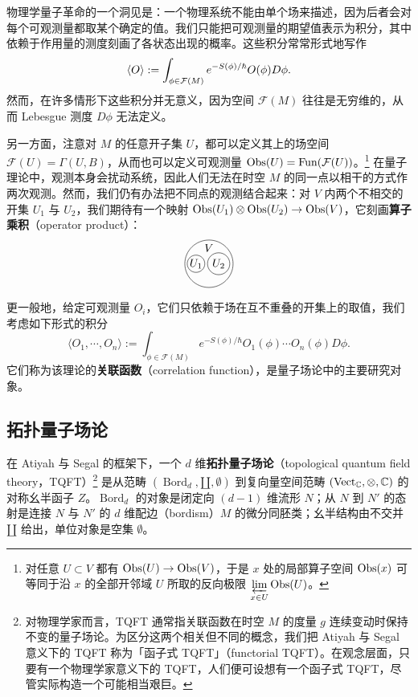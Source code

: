 物理学量子革命的一个洞见是：一个物理系统不能由单个场来描述，因为后者会对每个可观测量都取某个确定的值。我们只能把可观测量的期望值表示为积分，其中依赖于作用量的测度刻画了各状态出现的概率。这些积分常常形式地写作
\begin{equation}
    \langle O\rangle :=  \int_{\phi\in \mathcal{F}(M)} e^{ - S(\phi)/ \hbar  } O(\phi) D \phi.  \label{eq:expected-value}\notag
\end{equation} 然而，在许多情形下这些积分并无意义，因为空间 $\mathcal{F}(M)$ 往往是无穷维的，从而 Lebesgue 测度 $D\phi$ 无法定义。

另一方面，注意对 $M$ 的任意开子集 $U$，都可以定义其上的场空间 $\mathcal{F}(U)=\Gamma(U,B)$，从而也可以定义可观测量 $\operatorname{Obs}(U) = \operatorname{Fun}(\mathcal{F}(U))$。\footnote{对任意 $U\subset V$ 都有 $\operatorname{Obs}(U)\to \operatorname{Obs}(V)$，于是 $x$ 处的局部算子空间 $\operatorname{Obs}(x)$ 可等同于沿 $x$ 的全部开邻域 $U$ 所取的反向极限 $\displaystyle\varprojlim_{x \in U} \operatorname{Obs}(U)$。} 在量子理论中，观测本身会扰动系统，因此人们无法在时空 $M$ 的同一点以相干的方式作两次观测。然而，我们仍有办法把不同点的观测结合起来：对 $V$ 内两个不相交的开集 $U_1$ 与 $U_2$，我们期待有一个映射 $\operatorname{Obs}(U_1) \otimes \operatorname{Obs} (U_2) \to \operatorname{Obs} (V)$，它刻画\textbf{算子乘积}（operator product）：
\begin{equation*}
\tikz{
	\node[draw, circle, inner sep=0.5pt ] (a) at (-3.9,0) {$U_1$};
	\node[draw, circle, inner sep=2pt] (b) at (-3.2,0) {$U_2$};	
	\node[draw, circle, inner sep=15pt] (c) at (-3.5,0) {};	
	\node at (-3.5,0.5) {$V$}
}
\end{equation*}
更一般地，给定可观测量 $O_i$，它们只依赖于场在互不重叠的开集上的取值，我们考虑如下形式的积分
\[ \langle O_1,\cdots,O_n\rangle :=  \int_{\phi\in \mathcal{F}(M)} e^{ - S(\phi)/ \hbar  } O_1(\phi)\cdots O_n(\phi) D \phi.   \]	
它们称为该理论的\textbf{关联函数}（correlation function），是量子场论中的主要研究对象。

\subsection{拓扑量子场论}
\label{sec:TQFT}

在 Atiyah 与 Segal 的框架下，一个 $d$ 维\textbf{拓扑量子场论}（topological quantum field theory，TQFT）\footnote{对物理学家而言，TQFT 通常指关联函数在时空 $M$ 的度量 $g$ 连续变动时保持不变的量子场论。为区分这两个相关但不同的概念，我们把 Atiyah 与 Segal 意义下的 TQFT 称为「函子式 TQFT」（functorial TQFT）。在观念层面，只要有一个物理学家意义下的 TQFT，人们便可设想有一个函子式 TQFT，尽管实际构造一个可能相当艰巨。} 是从范畴 $(\operatorname{Bord}_d,\amalg,\emptyset)$ 到复向量空间范畴 $(\operatorname{Vect}_{\mathbb{C}},\otimes,\mathbb{C})$ 的对称幺半函子 $Z$。$\operatorname{Bord}_d$ 的对象是闭定向 $(d-1)$ 维流形 $N$；从 $N$ 到 $N'$ 的态射是连接 $N$ 与 $N'$ 的 $d$ 维配边（bordism）$M$ 的微分同胚类；幺半结构由不交并 $\amalg$ 给出，单位对象是空集 $\emptyset$。

